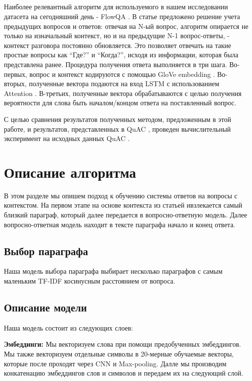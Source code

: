 \documentclass[12pt,twoside]{article}
\begin{document}
\subsection{}
Наиболее релевантный алгоритм для используемого в нашем исследовании датасета на сегодняшний день -  FlowQA \cite{flowqa}. В статье предложено решение учета предыдущих вопросов и ответов: отвечая на N-ый вопрос, алгоритм опирается не только на изначальный контекст, но и на предыдущие N-1 вопрос-ответы, - контекст разговора постоянно обновляется. Это позволяет отвечать на такие простые вопросы как “Где?” и “Когда?”, исходя из информации, которая была представлена ранее. Процедура получения ответа выполняется в три шага. Во-первых, вопрос и контекст кодируются с помощью GloVe embedding \cite{glove}. Во-вторых, полученные вектора подаются на вход LSTM \cite{lstm} с использованием Attention \cite{rectrends2018}. В-третьих, полученные вектора обрабатываются с целью получения вероятности для слова быть началом/концом ответа на поставленный вопрос.  

С целью сравнения результатов полученных методом, предложенным в этой работе, и результатов, представленных в QuAC \cite{quac}, проведен вычислительный эксперимент на исходных данных QuAC \cite{quac}.

\section{Описание алгоритма}
В этом разделе мы опишем подход к обучению системы ответов на вопросы с контекстом. На первом этапе на основе контекста из статьей ивзлекается самый близкий параграф, который далее передается в вопросно-ответную модель. Далее вопросно-ответная модель находит в тексте параграфа начало и конец ответа.

\subsection{Выбор параграфа}
Наша модель выбора параграфа выбирает несколько параграфов с самым маленьким TF-IDF косинусным расстоянием от вопроса.
 
\subsection{Описание модели}
Наша модель состоит из следующих слоев:

\textbf{Эмбеддинги:}
Мы векторизуем слова при помощи предобученных эмбеддингов. Мы также векторизуем отдельные символы в 20-мерные обучаемые векторы, которые после проходят через CNN и Max-pooling. Далле мы производим конкатенацию эмбеддингов слов и символов и передаем их на следующий слой.
\end{document}
